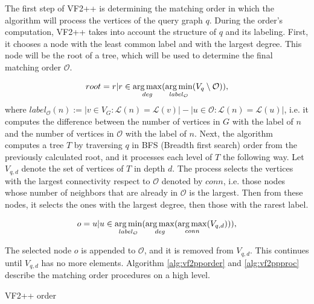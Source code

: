 The first step of VF2++ is determining the matching order in which the algorithm will process
the vertices of the query graph $q$. During the order's computation, VF2++ takes into account
the structure of $q$ and its labeling. First, it chooses a node with the least common label 
and with the largest degree. This node will be the root of a tree, which will be used to determine
the final matching order $\mathcal{O}$.


\[ root = {r | r \in \operatorname*{arg\,max}_{deg}(\operatorname*{arg\,min}_{label_{\mathcal{O}}}(V_q \setminus \mathcal{O}))}, \]
where $label_{\mathcal{O}}(n) := |{v \in V_G : \mathcal{L}(n) = \mathcal{L}(v)}| - |{u \in \mathcal{O}: \mathcal{L}(n) = \mathcal{L}(u)}|$, 
i.e. it computes the difference between the number of vertices in $G$ with the label of $n$ and 
the number of vertices in $\mathcal{O}$ with the label of $n$. Next, the algorithm computes a tree 
$T$ by traversing $q$ in BFS (Breadth first search) order from the previously calculated root, and
it processes each level of $T$ the following way. Let $V_{q,d}$ denote the set of vertices of $T$ in
depth $d$. The process selects the vertices with the largest connectivity respect to $\mathcal{O}$ denoted by $conn$,
i.e. those nodes whose number of neighbors that are already in $\mathcal{O}$ is the largest. Then
from these nodes, it selects the ones with the largest degree, then those with the rarest label.

\[ o = {u | u \in \operatorname*{arg\,min}_{label_{\mathcal{O}}}(\operatorname*{arg\,max}_{deg}(\operatorname*{arg\,max}_{conn}(V_{q,d})))}, \]

The selected node $o$ is appended to $\mathcal{O}$, and it is removed from $V_{q,d}$. This continues 
until $V_{q,d}$ has no more elements. Algorithm \ref{alg:vf2pporder} and \ref{alg:vf2ppproc} describe
the matching order procedures on a high level.

\begin{algorithm}[h]
    \caption{VF2++ order}
    \label{alg:vf2pporder}
    \SetAlgoLined\DontPrintSemicolon
\end{algorithm}

